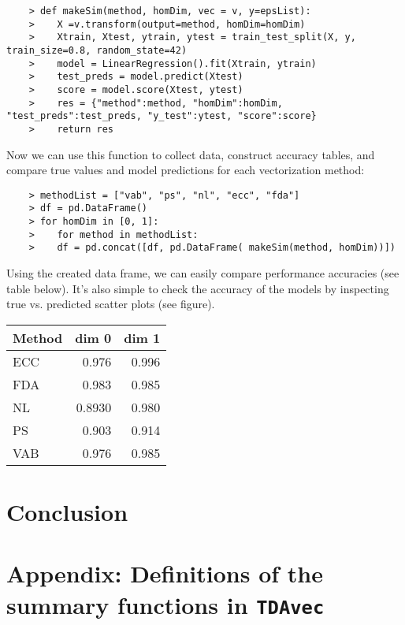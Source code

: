\documentclass{article}
\begin{document}
\begin{verbatim}
    > def makeSim(method, homDim, vec = v, y=epsList):
    >    X =v.transform(output=method, homDim=homDim)
    >    Xtrain, Xtest, ytrain, ytest = train_test_split(X, y, train_size=0.8, random_state=42)
    >    model = LinearRegression().fit(Xtrain, ytrain)
    >    test_preds = model.predict(Xtest)
    >    score = model.score(Xtest, ytest)
    >    res = {"method":method, "homDim":homDim, "test_preds":test_preds, "y_test":ytest, "score":score}
    >    return res
\end{verbatim}
Now we can use this function to collect data, construct accuracy tables, and compare true values and model predictions for each vectorization method:


\begin{verbatim}
    > methodList = ["vab", "ps", "nl", "ecc", "fda"]
    > df = pd.DataFrame()
    > for homDim in [0, 1]:
    >    for method in methodList:
    >    df = pd.concat([df, pd.DataFrame( makeSim(method, homDim))])
\end{verbatim}
Using the created data frame, we can easily compare performance accuracies (see table below). It's also simple to check the accuracy of the models by inspecting true vs. predicted scatter plots (see figure).




\begin{table}[htbp]
  \centering
  \begin{tabular}{lrr}
   \hline
   Method & dim 0 & dim 1 \\
   \hline
   ECC & 0.976 & 0.996 \\
   FDA & 0.983 & 0.985 \\
   NL & 0.8930 & 0.980 \\
   PS & 0.903 & 0.914 \\
   VAB & 0.976 & 0.985 \\
   \hline
  \end{tabular}
\end{table}

\section{Conclusion}



\section{Appendix: Definitions of the summary functions in \texttt{TDAvec}}
\end{document}
